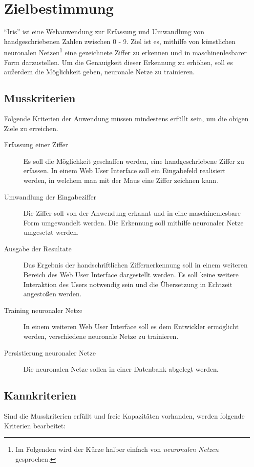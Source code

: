 \section{Zielbestimmung}
``Iris'' ist eine Webanwendung zur Erfassung und Umwandlung von handgeschriebenen Zahlen zwischen 0 - 9. Ziel ist es, mithilfe von künstlichen neuronalen Netzen\footnote{Im Folgenden wird der Kürze halber einfach von \emph{neuronalen Netzen} gesprochen.} eine gezeichnete Ziffer zu erkennen und in maschinenlesbarer Form darzustellen.
Um die Genauigkeit dieser Erkennung zu erhöhen, soll es außerdem die Möglichkeit geben, neuronale Netze zu trainieren.
 
\subsection{Musskriterien}

Folgende Kriterien der Anwendung müssen mindestens erfüllt sein, um die obigen Ziele zu erreichen.

\begin{description}
\item [Erfassung einer Ziffer]
Es soll die Möglichkeit geschaffen werden, eine handgeschriebene Ziffer zu erfassen. In einem Web User Interface soll ein Eingabefeld realisiert werden, in welchem man mit der Maus eine Ziffer zeichnen kann.
\item [Umwandlung der Eingabeziffer]
Die Ziffer soll von der Anwendung erkannt und in eine maschinenlesbare Form umgewandelt werden. Die Erkennung soll mithilfe neuronaler Netze umgesetzt werden.
\item [Ausgabe der Resultate]
Das Ergebnis der handschriftlichen Ziffernerkennung soll in einem weiteren Bereich des Web User Interface dargestellt werden. Es soll keine weitere Interaktion des Users notwendig sein und die Übersetzung in Echtzeit angestoßen werden.
\item [Training neuronaler Netze]
In einem weiteren Web User Interface soll es dem Entwickler ermöglicht werden, verschiedene neuronale Netze zu trainieren.
\item [Persistierung neuronaler Netze]
Die neuronalen Netze sollen in einer Datenbank abgelegt werden.
\end{description}
 
\subsection{Kannkriterien}

Sind die Musskriterien erfüllt und freie Kapazitäten vorhanden, werden folgende Kriterien bearbeitet:

